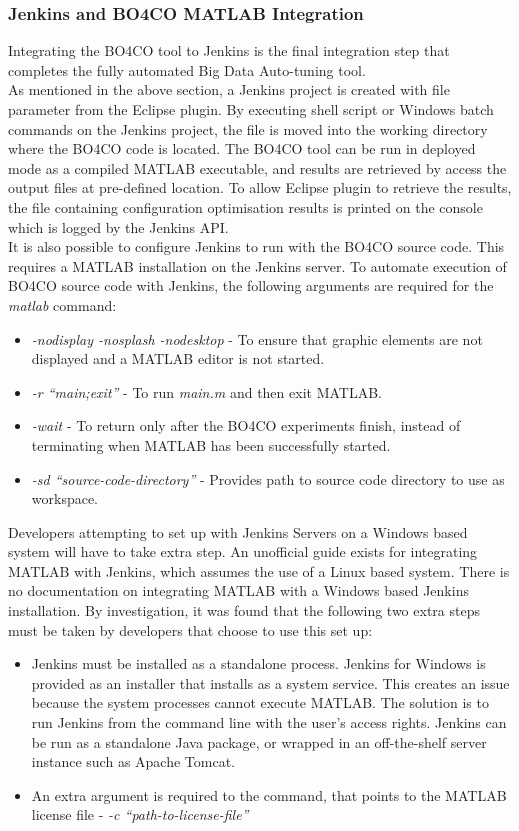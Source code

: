 \subsubsection{Jenkins and BO4CO MATLAB Integration}
Integrating the BO4CO tool to Jenkins is the final integration step that completes the fully automated Big Data Auto-tuning tool.\\
As mentioned in the above section, a Jenkins project is created with file parameter from the Eclipse plugin. By executing shell script or Windows batch commands on the Jenkins project, the file is moved into the working directory where the BO4CO code is located. The BO4CO tool can be run in deployed mode as a compiled MATLAB executable, and results are retrieved by access the output files at pre-defined location. To allow Eclipse plugin to retrieve the results, the file containing configuration optimisation results is printed on the console which is logged by the Jenkins API.\\
It is also possible to configure Jenkins to run with the BO4CO source code. This requires a MATLAB installation on the Jenkins server. To automate execution of BO4CO source code with Jenkins, the following arguments are required for the \textit{matlab} command:
\begin{itemize}
\item \textit{-nodisplay -nosplash -nodesktop} - To ensure that graphic elements are not displayed and a MATLAB editor is not started.
\item \textit{-r ``main;exit''} - To run \textit{main.m} and then exit MATLAB.
\item \textit{-wait} - To return only after the BO4CO experiments finish, instead of terminating when MATLAB has been successfully started.
\item \textit{-sd ``source-code-directory''} - Provides path to source code directory to use as workspace.
\end{itemize}
Developers attempting to set up with Jenkins Servers on a Windows based system will have to take extra step. An unofficial guide exists for integrating MATLAB with Jenkins, which assumes the use of a Linux based system. There is no documentation on integrating MATLAB with a Windows based Jenkins installation. By investigation, it was found that the following two extra steps must be taken by developers that choose to use this set up:
\begin{itemize}
\item Jenkins must be installed as a standalone process. Jenkins for Windows is provided as an installer that installs as a system service. This creates an issue because the system processes cannot execute MATLAB. The solution is to run Jenkins from the command line with the user's access rights. Jenkins can be run as a standalone Java package, or wrapped in an off-the-shelf server instance such as Apache Tomcat.
\item An extra argument is required to the command, that points to the MATLAB license file - \textit{-c ``path-to-license-file''}
\end{itemize}
